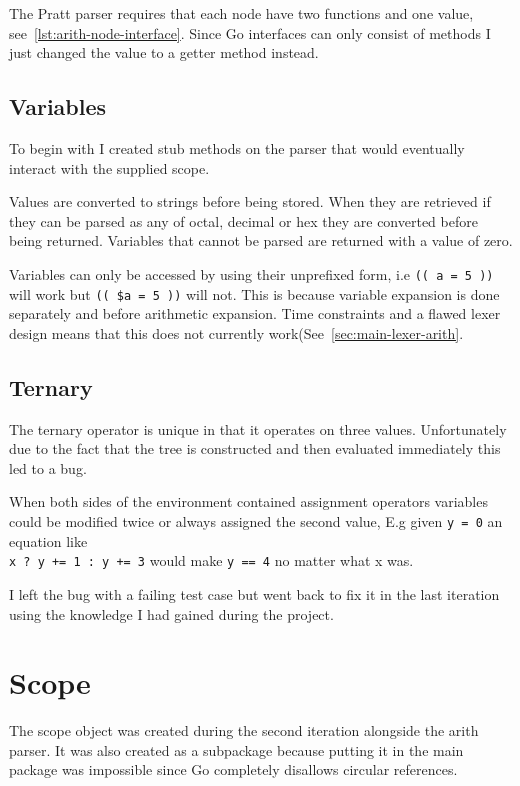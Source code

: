 The Pratt parser requires that each node have two functions and one value, see~\ref{lst:arith-node-interface}.
Since Go interfaces can only consist of methods I just changed the value to a getter method instead.

\subsection{Variables}
To begin with I created stub methods on the parser that would eventually interact with the supplied scope.

Values are converted to strings before being stored.
When they are retrieved if they can be parsed as any of octal, decimal or hex they are converted before being returned.
Variables that cannot be parsed are returned with a value of zero.

Variables can only be accessed by using their unprefixed form, i.e \verb!(( a = 5 ))! will work but \verb!(( $a = 5 ))! will not.
This is because variable expansion is done separately and before arithmetic expansion.
Time constraints and a flawed lexer design means that this does not currently work(See~\ref{sec:main-lexer-arith}.

\subsection{Ternary}
The ternary operator is unique in that it operates on three values.
Unfortunately due to the fact that the tree is constructed and then evaluated immediately this led to a bug.

When both sides of the environment contained assignment operators variables could be modified twice or always assigned the second value, E.g given \verb!y = 0! an equation like \\ \verb!x ? y += 1 : y += 3! would make \verb!y == 4! no matter what x was.

I left the bug with a failing test case but went back to fix it in the last iteration using the knowledge I had gained during the project.

\section{Scope}
\label{sec:scope}
The scope object was created during the second iteration alongside the arith parser.
It was also created as a subpackage because putting it in the main package was impossible since Go completely disallows circular references.

